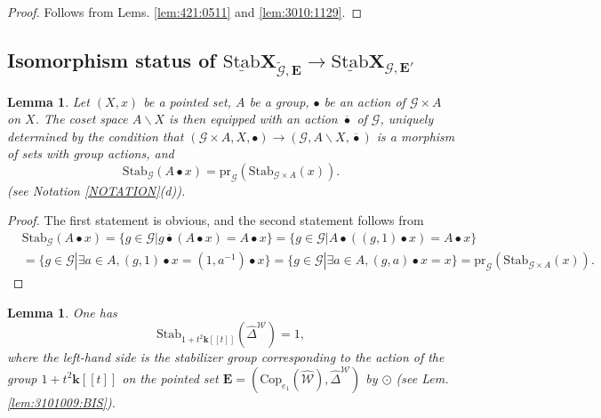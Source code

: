 \documentclass[10pt]{amsart}
\newtheorem{lem}[thm]{Lemma}
\numberwithin{equation}{subsection}
\begin{document}
\begin{proof}
 Follows from Lems. \ref{lem:421:0511} and \ref{lem:3010:1129}. 
\end{proof}

\subsection{Isomorphism status of $\underline{\mathrm{Stab}}\mathbf X_{{\tilde{\mathcal G}},\mathbf E}\to
\underline{\mathrm{Stab}}\mathbf X_{\mathcal G,\mathbf E'}$}\label{sect:4:5:5786}

\begin{lem}\label{lem:general:0611}
    Let $(X,x)$ be a pointed set, $A$ be a group, $\bullet$ be an action of $\mathcal G\times A$ on $X$. 
    The coset space $A\backslash X$ is then equipped with an action $\overline\bullet$ of $\mathcal G$, uniquely determined by the 
    condition that $(\mathcal G\times A,X,\bullet)\to(\mathcal G,A\backslash X,\overline\bullet)$ is a morphism of 
    sets with group actions, and 
    $$
    \mathrm{Stab}_{\mathcal G}(A\bullet x)=\mathrm{pr}_{\mathcal G}(\mathrm{Stab}_{\mathcal G\times A}(x)). 
    $$
    (see Notation \ref{NOTATION}(d)). 
\end{lem}

\begin{proof}
The first statement is obvious, and the second statement follows from 
\begin{align*}
&  \mathrm{Stab}_{\mathcal G}(A\bullet x)
=\{g\in\mathcal G|g\overline\bullet(A\bullet x)=A\bullet x\}
=\{g\in\mathcal G|A\bullet ((g,1)\bullet x)=A\bullet x\}
\\ & =\{g\in\mathcal G|\exists a\in A, (g,1)\bullet x=(1,a^{-1})\bullet x\}
=\{g\in\mathcal G|\exists a\in A, (g,a)\bullet x=x\}
=\mathrm{pr}_{\mathcal G}(\mathrm{Stab}_{\mathcal G\times A}(x)).   
\end{align*}
\end{proof}

\begin{lem}\label{lem:part:0611}
    One has
    $$
    \mathrm{Stab}_{1+t^2\mathbf k[[t]]}(\hat\Delta^{\mathcal W})=1, 
    $$
where the left-hand side is the stabilizer group corresponding to 
the action of the group $1+t^2\mathbf k[[t]]$ on the pointed set 
$\mathbf E=(\mathrm{Cop}_{e_1}(\hat{\mathcal W}),\hat\Delta^{\mathcal W})$ by $\odot$ (see Lem. \ref{lem:3101009:BIS}).   
\end{lem}
\end{document}
